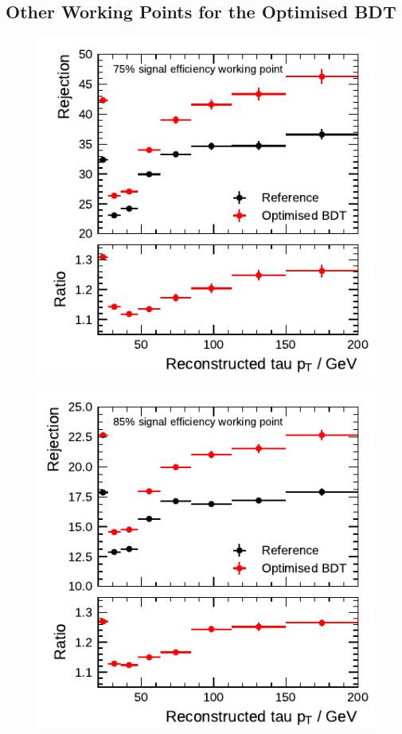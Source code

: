 \clearpage
\subsection{Other Working Points for the Optimised BDT}
\label{app:bdt_working_point_rejection}
\noindent
\begin{minipage}{\textwidth}
  \captionsetup{type=figure}
  \begin{subfigure}{0.48\textwidth}
    \centering
    \includegraphics{./figures/bdt_perf/post_optimisation/rejection_medium_1p.pdf}
  \end{subfigure}\hfill
  \begin{subfigure}{0.48\textwidth}
    \centering
    \includegraphics{./figures/bdt_perf/post_optimisation/rejection_loose_1p.pdf}

\end{subfigure}
\end{minipage}
